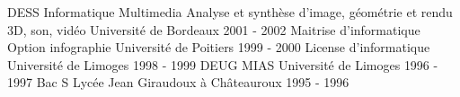 \begin{cvhonors}
  \cvhonor
    {DESS Informatique Multimedia}
 	{Analyse et synthèse d'image, géométrie et rendu 3D, son, vidéo}
    {Université de Bordeaux}
    {2001 - 2002}
  \cvhonor
    {Maitrise d'informatique}
    {Option infographie}
    {Université de Poitiers}
    {1999 - 2000}
  \cvhonor
    {License d'informatique}
    {}
    {Université de Limoges}
    {1998 - 1999}
  \cvhonor
    {DEUG MIAS}
    {}
    {Université de Limoges}
    {1996 - 1997}
  \cvhonor
    {Bac S}
    {}
    {Lycée Jean Giraudoux à Châteauroux}
    {1995 - 1996}
    {}
\end{cvhonors}
